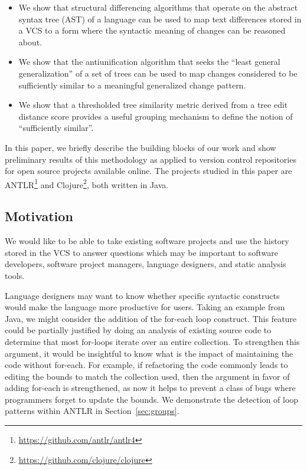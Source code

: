 \begin{itemize}

\item We show that structural differencing algorithms that operate on the
abstract syntax tree (AST) of a language can be used to map text
differences stored in a VCS to a form where the syntactic meaning of changes
can be reasoned about.

\item We show that the antiunification algorithm that seeks the ``least general
generalization'' of a set of trees can be used to map changes considered to be
sufficiently similar to a meaningful generalized change pattern.

\item We show that a thresholded tree similarity metric derived from
a tree edit distance score provides a useful grouping mechanism to define
the notion of ``sufficiently similar''.

\end{itemize}

In this paper, we briefly describe the building blocks of our work and show
preliminary results of this methodology as applied to version control
repositories for open source projects available online.  The projects studied
in this paper are ANTLR\footnote{\url{https://github.com/antlr/antlr4}} and
Clojure\footnote{\url{https://github.com/clojure/clojure}}, both written in
Java.

\subsection{Motivation}
\label{sec:motivation}

We would like to be able to take existing software projects and use the history
stored in the VCS to answer questions which may be important to software
developers, software project managers, language designers, and static analysis
tools.

Language designers may want to know whether specific syntactic constructs would
make the language more productive for users. Taking an example from Java, we
might consider the addition of the for-each loop construct. This feature could
be partially justified by doing an analysis of existing source code to
determine that most for-loops iterate over an entire collection. To strengthen
this argument, it would be insightful to know what is the impact of maintaining
the code without for-each. For example, if refactoring the code commonly leads
to editing the bounds to match the collection used, then the argument in favor
of adding for-each is strengthened, as now it helps to prevent a class of bugs
where programmers forget to update the bounds. We demonstrate the detection of
loop patterns within ANTLR in Section~\ref{sec:groups}.

